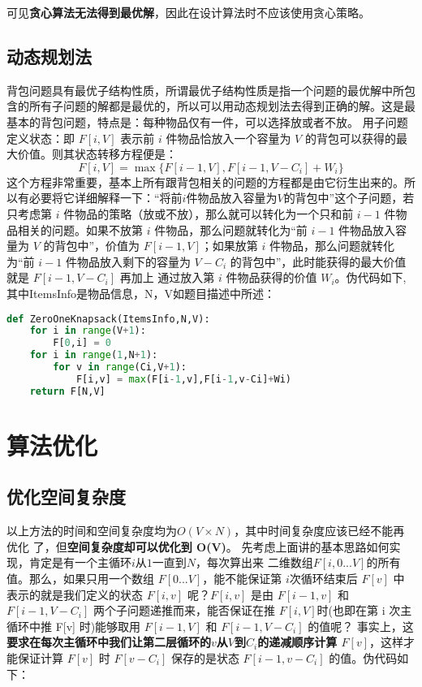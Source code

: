 可见\textbf{贪心算法无法得到最优解}，因此在设计算法时不应该使用贪心策略。

\subsection{动态规划法}
背包问题具有最优子结构性质，所谓最优子结构性质是指一个问题的最优解中所包含的所有子问题的解都是最优的，所以可以用动态规划法去得到正确的解。这是最基本的背包问题，特点是：每种物品仅有一件，可以选择放或者不放。
用子问题定义状态：即 $F[i, V]$ 表示前 $i$ 件物品恰放入一个容量为 $V$ 的背包可以获得的最大价值。则其状态转移方程便是：
$$
F[i, V] = \max{\{F[i-1, V], F[i-1, V-C_i] + W_i\}}
$$
这个方程非常重要，基本上所有跟背包相关的问题的方程都是由它衍生出来的。所
以有必要将它详细解释一下：“将前$i$件物品放入容量为$V$的背包中”这个子问题，若只考虑第 $i$ 件物品的策略（放或不放），那么就可以转化为一个只和前 $i-1$ 件物品相关的问题。如果不放第 $i$ 件物品，那么问题就转化为“前 $i-1$ 件物品放入容量为 $V$ 的背包中”，价值为 $F[i-1, V]$；如果放第 $i$ 件物品，那么问题就转化为“前 $i-1$ 件物品放入剩下的容量为 $V-C_i$ 的背包中”，此时能获得的最大价值就是 $F[i-1, V-C_i]$ 再加上
通过放入第 $i$ 件物品获得的价值 $W_i$。伪代码如下,其中ItemsInfo是物品信息，N，V如题目描述中所述：

\begin{lstlisting}[language=python, caption = 伪代码实现--ZeroOneKnapsack]
def ZeroOneKnapsack(ItemsInfo,N,V):
    for i in range(V+1):
        F[0,i] = 0
    for i in range(1,N+1):
        for v in range(Ci,V+1):
            F[i,v] = max(F[i-1,v],F[i-1,v-Ci]+Wi) 
    return F[N,V]
\end{lstlisting}

\section{算法优化}
\subsection{优化空间复杂度}
以上方法的时间和空间复杂度均为$O(V \times N)$，其中时间复杂度应该已经不能再优化
了，但\textbf{空间复杂度却可以优化到 O(V)}。
先考虑上面讲的基本思路如何实现，肯定是有一个主循环$i$从$1$一直到$N$，每次算出来
二维数组$F[i, 0...V]$的所有值。那么，如果只用一个数组 $F[0...V]$，能不能保证第 $i$次循环结束后 $F[v]$ 中表示的就是我们定义的状态 $F[i, v]$ 呢？$F[i, v]$ 是由 $F[i-1, v]$ 和$F[i-1, V-C_i]$ 两个子问题递推而来，能否保证在推 $F[i, V]$时(也即在第 i 次主循环中推 F[v] 时)能够取用 $F[i-1, V]$ 和 $F[i-1, V-C_i]$ 的值呢？
事实上，这\textbf{要求在每次主循环中我们让第二层循环的$v$从$V$到$C_i$的递减顺序计算 $F[v]$}，这样才能保证计算 $F[v]$ 时 $F[v-C_i]$ 保存的是状态 $F[i-1,v-C_i]$ 的值。伪代码如下：

